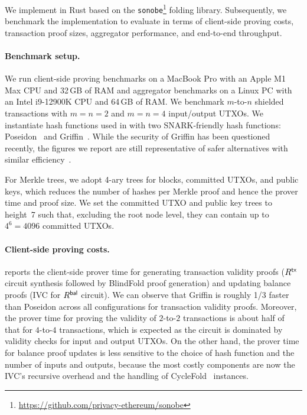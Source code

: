 
We implement \Protocol in Rust based on the \texttt{sonobe}\footnote{\url{https://github.com/privacy-ethereum/sonobe}} folding library.
Subsequently, we benchmark the implementation to evaluate \Protocol in terms of client-side proving costs, transaction proof sizes, aggregator performance, and end-to-end throughput.

\paragraph{Benchmark setup.}
We run client-side proving benchmarks on a MacBook Pro with an Apple M1 Max CPU and 32\,GB of RAM and aggregator benchmarks on a Linux PC with an Intel i9-12900K CPU and 64\,GB of RAM.
We benchmark $m$-to-$n$ shielded transactions with $m = n = 2$ and $m = n = 4$ input/output \acp{UTXO}.
We instantiate hash functions used in \Protocol with two SNARK-friendly hash functions: Poseidon~\cite{USENIX:GKRRS21} and Griffin~\cite{C:GHRSWW23}.
While the security of Griffin has been questioned~\cite{C:BBLAOP24,EPRINT:CamRoy25} recently, the figures we report are still representative of safer alternatives with similar efficiency~\cite{EPRINT:BoePer25}.

For Merkle trees, we adopt 4-ary trees for blocks, committed \acp{UTXO}, and public keys, which reduces the number of hashes per Merkle proof and hence the prover time and proof size.
We set the committed \ac{UTXO} and public key trees to height~7 such that, excluding the root node level, they can contain up to $4^{6} = 4096$ committed \acp{UTXO}.

\paragraph{Client-side proving costs.}
 reports the client-side prover time for generating transaction validity proofs
($R^\mathsf{tx}$ circuit synthesis followed by BlindFold proof generation) and updating balance proofs (\ac{IVC} for $R^\mathsf{bal}$ circuit).
We can observe that Griffin is roughly 1/3 faster than Poseidon across all configurations for transaction validity proofs.
Moreover, the prover time for proving the validity of $2$-to-$2$ transactions is about half of that for $4$-to-$4$ transactions, which is expected as the circuit is dominated by validity checks for input and output \acp{UTXO}.
On the other hand, the prover time for balance proof updates is less sensitive to the choice of hash function and the number of inputs and outputs, because the most costly components are now the \ac{IVC}'s recursive overhead and the handling of CycleFold~\cite{EPRINT:KotSet23b} instances.

